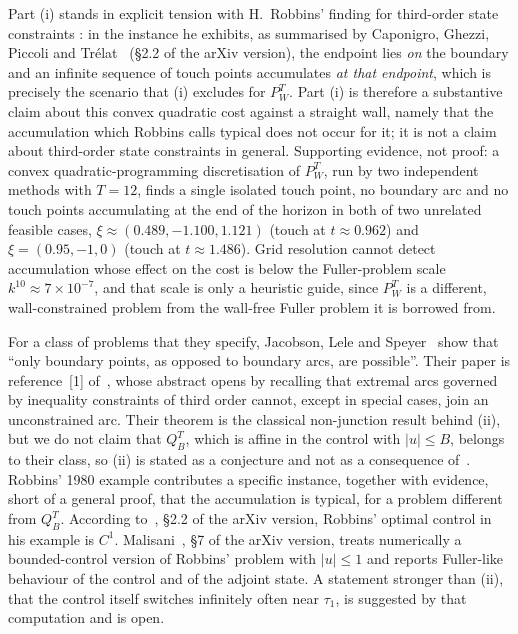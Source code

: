 \documentclass[11pt,reqno]{amsart}
\theoremstyle{definition}
\numberwithin{equation}{section}
\begin{document}
Part (i) stands in explicit tension with H.~Robbins' finding for third-order state constraints
\cite{robbins1980}: in the instance he exhibits, as summarised by Caponigro, Ghezzi, Piccoli and
Tr\'elat~\cite{caponigro2018} (\S2.2 of the arXiv version), the endpoint lies \emph{on} the boundary
and an infinite sequence of touch points accumulates \emph{at that endpoint}, which is precisely the
scenario that (i) excludes for $P_W^T$. Part (i) is therefore a substantive claim about this convex
quadratic cost against a straight wall, namely that the accumulation which Robbins calls typical does
not occur for it; it is not a claim about third-order state constraints in general. Supporting
evidence, not proof: a convex quadratic-programming discretisation of $P_W^T$, run by two independent
methods with $T=12$, finds a single isolated touch point, no boundary arc and no touch points
accumulating at the end of the horizon in both of two unrelated feasible cases,
$\xi\approx(0.489,-1.100,1.121)$ (touch at $t\approx0.962$) and $\xi=(0.95,-1,0)$ (touch at
$t\approx1.486$). Grid resolution cannot detect accumulation whose effect on the cost is below the
Fuller-problem scale $k^{10}\approx7\times10^{-7}$, and that scale is only a heuristic guide, since
$P_W^T$ is a different, wall-constrained problem from the wall-free Fuller problem it is borrowed from.

For a class of problems that they specify, Jacobson, Lele and Speyer~\cite{jls1971} show that ``only
boundary points, as opposed to boundary arcs, are possible''. Their paper is reference~[1]
of~\cite{robbins1980}, whose abstract opens by recalling that extremal arcs governed by inequality
constraints of third order cannot, except in special cases, join an unconstrained arc. Their theorem is the classical
non-junction result behind (ii), but we do not claim that $Q_B^T$, which is affine in the control with
$|u|\le B$, belongs to their class, so (ii) is stated as a conjecture and not as a consequence
of~\cite{jls1971}. Robbins' 1980 example contributes a specific instance, together with evidence,
short of a general proof, that the accumulation is typical, for a problem different from $Q_B^T$.
According to~\cite{caponigro2018}, \S2.2 of the arXiv version, Robbins' optimal control in his example
is $C^1$. Malisani~\cite{malisani2023}, \S7 of the arXiv version, treats numerically a bounded-control
version of Robbins' problem with $|u|\le1$ and reports Fuller-like behaviour of the control and of the
adjoint state. A statement stronger than (ii), that the control itself switches infinitely often near
$\tau_1$, is suggested by that computation and is open.
\end{document}
